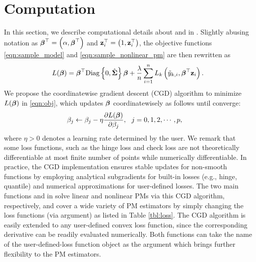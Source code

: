 \section{Computation}\label{sec:optim}
In this section, we describe computational details about  and  in .
Slightly abusing notation as $\boldsymbol{\beta}^\top = \left(\alpha, \boldsymbol{\beta}^\top\right)$ and $\mathbf{z}_i^\top = \left(1, \mathbf{z}_{i}^\top \right)$, the objective functions \eqref{eqn:sample_model} and \eqref{eqn:sample_nonlinear_pm} are then rewritten as
\begin{align} \label{eqn:obj}
L(\boldsymbol{\beta}) = \boldsymbol{\beta}^\top \mbox{Diag}\left\{0, \hat {\boldsymbol{\Sigma}}\right\} \boldsymbol{\beta} + \frac{\lambda}{n}\sum_{i=1}^{n} L_k\left(\tilde y_{k,i}, \boldsymbol{\beta}^\top \mathbf{z}_i \right).
\end{align}
We propose the coordinatewise gradient descent (CGD) algorithm to minimize $L(\boldsymbol{\beta})$ in \eqref{eqn:obj}, which updates $\boldsymbol{\beta}$ coordinatewisely as follows until converge:
\begin{align*}
\beta_j & \leftarrow \beta_j - \eta \frac{\partial L(\boldsymbol{\beta})}{\partial{\beta_j}}, ~~ j= 0, 1, 2, \cdots, p,
\end{align*}
where $\eta > 0$ denotes a learning rate determined by the user. 
We remark that some loss functions, such as the hinge loss and check loss are not theoretically differentiable at most finite number of points while numerically differentiable. 
{In practice, the CGD implementation ensures stable updates for non-smooth functions by employing analytical subgradients for built-in losses (e.g., hinge, quantile) and numerical approximations for user-defined losses.} 
The two main functions  and  in  solve linear and nonlinear PMs via this CGD algorithm, respectively, and cover a wide variety of PM estimators by simply changing the loss functions (via  argument) as listed in Table \ref{tbl:loss}. The CGD algorithm is easily extended to any user-defined convex loss function, since the corresponding derivative can be readily evaluated numerically. Both functions can take the name of the user-defined-loss function object as the  argument which brings further flexibility to the PM estimators. 

